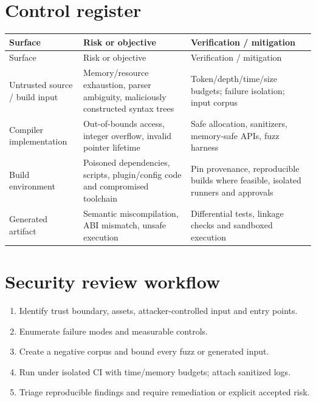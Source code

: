 \documentclass[10pt,letterpaper]{article}
\begin{document}
\section{Control register}
\begin{longtable}{|>{\raggedright\arraybackslash}p{}|>{\raggedright\arraybackslash}p{}|>{\raggedright\arraybackslash}p{}|}
\hline
Surface & Risk or objective & Verification / mitigation\\ \hline\endfirsthead
\hline
Surface & Risk or objective & Verification / mitigation\\ \hline\endhead
Untrusted source / build input & Memory/resource exhaustion, parser ambiguity, maliciously constructed syntax trees & Token/depth/time/size budgets; failure isolation; input corpus\\ \hline
Compiler implementation & Out-of-bounds access, integer overflow, invalid pointer lifetime & Safe allocation, sanitizers, memory-safe APIs, fuzz harness\\ \hline
Build environment & Poisoned dependencies, scripts, plugin/config code and compromised toolchain & Pin provenance, reproducible builds where feasible, isolated runners and approvals\\ \hline
Generated artifact & Semantic miscompilation, ABI mismatch, unsafe execution & Differential tests, linkage checks and sandboxed execution\\ \hline
\end{longtable}

\section{Security review workflow}
\begin{enumerate}
\item Identify trust boundary, assets, attacker-controlled input and entry points.
\item Enumerate failure modes and measurable controls.
\item Create a negative corpus and bound every fuzz or generated input.
\item Run under isolated CI with time/memory budgets; attach sanitized logs.
\item Triage reproducible findings and require remediation or explicit accepted risk.
\end{enumerate}
\end{document}
